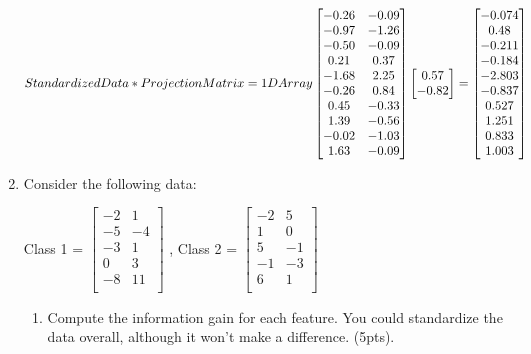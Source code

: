 \documentclass[12pt]{article}
\begin{document}
\begin{enumerate}
$
StandardizedData * ProjectionMatrix = 1DArray \\
\begin{bmatrix}
  -0.26 & -0.09 \\
  -0.97 & -1.26 \\
  -0.50 & -0.09 \\
   0.21 &  0.37 \\
  -1.68 &  2.25 \\
  -0.26 &  0.84 \\
   0.45 & -0.33 \\
   1.39 & -0.56 \\
  -0.02 & -1.03 \\
   1.63 & -0.09
\end{bmatrix}
\begin{bmatrix}
	0.57 \\
   -0.82
\end{bmatrix}
=
\begin{bmatrix}
	-0.074 \\
     0.48  \\
    -0.211 \\
    -0.184 \\
    -2.803 \\
    -0.837 \\
     0.527 \\
     1.251 \\
     0.833 \\
     1.003
\end{bmatrix}
$


\newpage
\item Consider the following data:\\
\begin{center}
Class 1 = 
$
 \begin{bmatrix}
	-2 & 1\\
	-5 & -4\\	
	-3 & 1\\
	0 & 3\\
	-8 & 11\\
	
\end{bmatrix}
$
, Class 2 = 
$
 \begin{bmatrix}
	-2 & 5\\
	1 & 0\\
	5 & -1\\
	-1 & -3\\
	6 & 1\\
\end{bmatrix}
$
\end{center}
	\begin{enumerate}
	\item Compute the information gain for each feature.  You could standardize the data overall, although it won't make a difference. (5pts).
	\hfill \break


\end{enumerate}
\end{enumerate}
\end{document}
